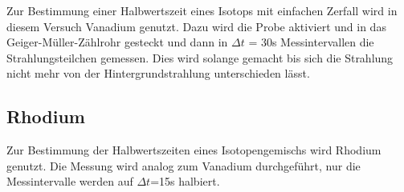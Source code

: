\noindent Zur Bestimmung einer Halbwertszeit eines Isotops mit einfachen Zerfall wird in diesem Versuch Vanadium genutzt. Dazu wird die Probe aktiviert und 
in das Geiger-Müller-Zählrohr gesteckt und dann in $\Delta t$ = 30s Messintervallen die Strahlungsteilchen gemessen. Dies wird solange gemacht 
bis sich die Strahlung nicht mehr von der Hintergrundstrahlung unterschieden lässt.

\subsection{Rhodium}

\noindent Zur Bestimmung der Halbwertszeiten eines Isotopengemischs wird Rhodium genutzt. Die Messung wird analog zum Vanadium durchgeführt, 
nur die Messintervalle werden auf $\Delta t$=15s halbiert.